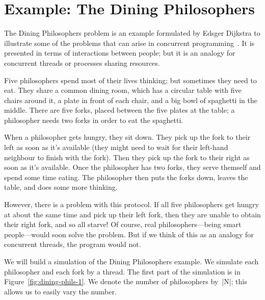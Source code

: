 \section{Example: The Dining Philosophers}

The Dining Philosophers problem is an example formulated by Edsger Dijkstra to
illustrate some of the problems that can arise in concurrent
programming~\cite{dining-phils}.  It is presented in terms of interactions
between people; but it is an analogy for concurrent threads or processes
sharing resources.

Five philosophers spend most of their lives thinking; but sometimes they need
to eat.  They share a common dining room, which has a circular table with five
chairs around it, a plate in front of each chair, and a big bowl of spaghetti
in the middle.  There are five forks, placed between the five plates at the
table; a philosopher needs two forks in order to eat the spaghetti. 

When a philosopher gets hungry, they sit down.  They pick up the fork to their
left as soon as it's available (they might need to wait for their left-hand
neighbour to finish with the fork).  Then they pick up the fork to their right
as soon as it's available.  Once the philosopher has two forks, they serve
themself and spend some time eating.  The philosopher then puts the forks
down, leaves the table, and does some more thinking.

However, there is a problem with this protocol.  If all five philosophers get
hungry at about the same time and pick up their left fork, then they are
unable to obtain their right fork, and so all starve!  Of course, real
philosophers---being smart people---would soon solve the problem.  But if we
think of this as an analogy for concurrent threads, the program would not.

We will build a simulation of the Dining Philosophers example.  We 
simulate each philosopher and each fork by a thread.  The first part of the
simulation is in Figure~\ref{fig:dining-phils-1}.  We denote the number of
philosophers by~|N|; this allows us to easily vary the number. 


